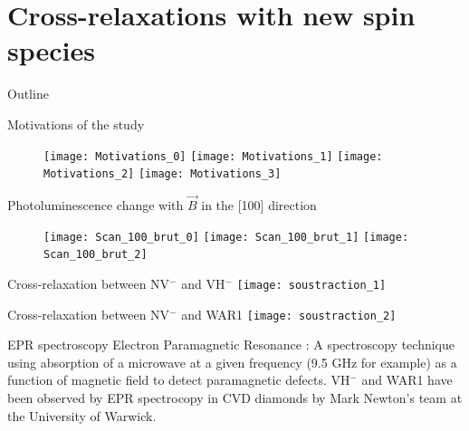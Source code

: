 \documentclass{beamer}
\begin{document}
\section{Cross-relaxations with new spin species}
\begin{frame}{Outline}
\tableofcontents[currentsection]
\end{frame}
\begin{frame}{Motivations of the study}
\begin{figure}
    \begin{overprint}
    \texttt{[image: Motivations\_0]}
    \texttt{[image: Motivations\_1]}
    \texttt{[image: Motivations\_2]}
    \texttt{[image: Motivations\_3]}
    \end{overprint}
\end{figure}
\end{frame}
\begin{frame}{Photoluminescence change with $\vec B$ in the [100] direction}
\begin{figure}
    \begin{overprint}
    \centering\texttt{[image: Scan\_100\_brut\_0]}
    \centering\texttt{[image: Scan\_100\_brut\_1]}
    \centering\texttt{[image: Scan\_100\_brut\_2]}
    \end{overprint}
\end{figure}
\end{frame}
\begin{frame}{Cross-relaxation between NV$^-$ and VH$^-$}
\texttt{[image: soustraction\_1]}
\end{frame}
\begin{frame}{Cross-relaxation between NV$^-$ and WAR1}
\texttt{[image: soustraction\_2]}
\end{frame}
\begin{frame}{EPR spectroscopy}
Electron Paramagnetic Resonance : A spectroscopy technique using absorption of a microwave at a given frequency (9.5 GHz for example) as a function of magnetic field to detect paramagnetic defects.
\bigbreak
VH$^-$ and WAR1  have been observed by EPR spectrocopy in CVD diamonds by Mark Newton's team at the University of Warwick.
\end{frame}
\end{document}
